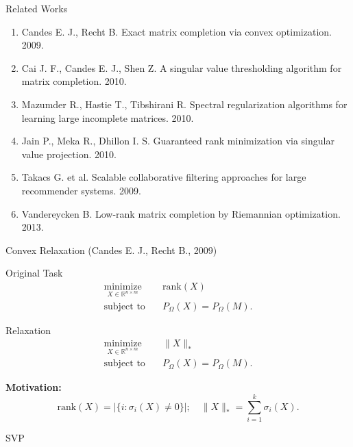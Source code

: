 \documentclass{beamer}
\begin{document}
\begin{frame}{Related Works}
	\begin{enumerate}
		\item Candes E. J., Recht B. Exact matrix completion via convex optimization. 2009.
		\item Cai J. F., Candes E. J., Shen Z. A singular value thresholding algorithm for matrix completion. 2010.
		\item Mazumder R., Hastie T., Tibshirani R. Spectral regularization algorithms for learning large incomplete matrices. 2010.
		\item Jain P., Meka R., Dhillon I. S. Guaranteed rank minimization via singular value projection. 2010.
		\item Takacs G. et al. Scalable collaborative filtering approaches for large recommender systems. 2009.
		\item Vandereycken B. Low-rank matrix completion by Riemannian optimization. 2013.
	\end{enumerate}
\end{frame}
\begin{frame}{Convex Relaxation (Candes E. J., Recht B., 2009)}
\begin{block}{Original Task}
\vspace{-0.5cm}
	\begin{align*}
	\mathop{\text{minimize}}\limits_{X \in \mathbb{R}^{n \times m}} \quad & 
	\text{rank} (X) \\
	\text{subject to} \quad & P_{\Omega} (X) = P_{\Omega} (M).
	\end{align*}
\end{block}
\begin{block}{Relaxation}
\vspace{-0.5cm}
	\begin{align*}
	\mathop{\text{minimize}}\limits_{X \in \mathbb{R}^{n \times m}} \quad & 
	\| X \|_* \\
	\text{subject to} \quad & P_{\Omega} (X) = P_{\Omega} (M).
	\end{align*}
\end{block}
\textbf{Motivation:}
$$
	\text{rank} (X) = |\{ i: \sigma_i(X) \neq 0\}|; \quad 
	\| X \|_* = \sum_{i=1}^{k} \sigma_i(X).
$$
\end{frame}
\begin{frame}{SVP}
\end{frame}
\end{document}
